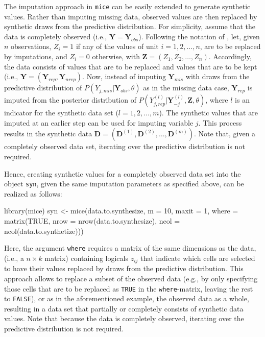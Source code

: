 \documentclass[psych,article,submit,moreauthors,pdftex]{mdpi}
\newenvironment{Shaded}{\begin{snugshade}}{\end{snugshade}}
\newcommand{\AttributeTok}[1]{\textcolor[rgb]{0.77,0.63,0.00}{#1}}
\newcommand{\ConstantTok}[1]{\textcolor[rgb]{0.00,0.00,0.00}{#1}}
\newcommand{\DecValTok}[1]{\textcolor[rgb]{0.00,0.00,0.81}{#1}}
\newcommand{\FunctionTok}[1]{\textcolor[rgb]{0.00,0.00,0.00}{#1}}
\newcommand{\NormalTok}[1]{#1}
\newcommand{\OtherTok}[1]{\textcolor[rgb]{0.56,0.35,0.01}{#1}}
\begin{document}
The imputation approach in \texttt{mice} can be easily extended to
generate synthetic values. Rather than imputing missing data, observed
values are then replaced by synthetic draws from the predictive
distribution. For simplicity, assume that the data is completely
observed (i.e., \(\textbf{Y} = \textbf{Y}_{obs}\)). Following the
notation of \citet{reiter_raghunathan_multiple_2007}, let, given \(n\)
observations, \(Z_i = 1\) if any of the values of unit
\(i = 1, 2, \dots, n\), are to be replaced by imputations, and
\(Z_i = 0\) otherwise, with \(\textbf{Z} = (Z_1, Z_2, \dots, Z_n)\).
Accordingly, the data consists of values that are to be replaced and
values that are to be kept (i.e.,
\(\textbf{Y} = (\textbf{Y}_{rep}, \textbf{Y}_{nrep})\). Now, instead of
imputing \(\textbf{Y}_{mis}\) with draws from the predictive
distribution of \(P(Y_{j, mis} | \textbf{Y}_{obs}, \theta)\) as in the
missing data case, \(\textbf{Y}_{rep}\) is imputed from the posterior
distribution of
\(P(Y^{(l)}_{j, rep} | \textbf{Y}^{(l)}_{-j}, \textbf{Z}, \theta)\),
where \(l\) is an indicator for the synthetic data set
(\(l = 1, 2, \dots, m\)). The synthetic values that are imputed at an
earlier step can be used for imputing variable \(j\). This process
results in the synthetic data
\(\textbf{D} = (\textbf{D}^{(1)}, \textbf{D}^{(2)}, \dots, \textbf{D}^{(m)})\).
Note that, given a completely observed data set, iterating over the
predictive distribution is not required.

Hence, creating synthetic values for a completely observed data set into
the object \texttt{syn}, given the same imputation parameters as
specified above, can be realized as follows:

\begin{Shaded}
\begin{Highlighting}[]
\FunctionTok{library}\NormalTok{(mice)}
\NormalTok{syn }\OtherTok{\textless{}{-}} \FunctionTok{mice}\NormalTok{(data.to.synthesize, }
            \AttributeTok{m =} \DecValTok{10}\NormalTok{,}
            \AttributeTok{maxit =} \DecValTok{1}\NormalTok{,}
            \AttributeTok{where =} \FunctionTok{matrix}\NormalTok{(}\ConstantTok{TRUE}\NormalTok{,}
                           \AttributeTok{nrow =} \FunctionTok{nrow}\NormalTok{(data.to.synthesize),}
                           \AttributeTok{ncol =} \FunctionTok{ncol}\NormalTok{(data.to.synthetize)))}
\end{Highlighting}
\end{Shaded}

Here, the argument \texttt{where} requires a matrix of the same
dimensions as the data, (i.e., a \(n \times k\) matrix) containing
logicals \(z_{ij}\) that indicate which cells are selected to have their
values replaced by draws from the predictive distribution. This approach
allows to replace a subset of the observed data (e.g., by only
specifying those cells that are to be replaced as \texttt{TRUE} in the
\texttt{where}-matrix, leaving the rest to \texttt{FALSE}), or as in the
aforementioned example, the observed data as a whole, resulting in a
data set that partially or completely consists of synthetic data values.
Note that because the data is completely observed, iterating over the
predictive distribution is not required.
\end{document}
